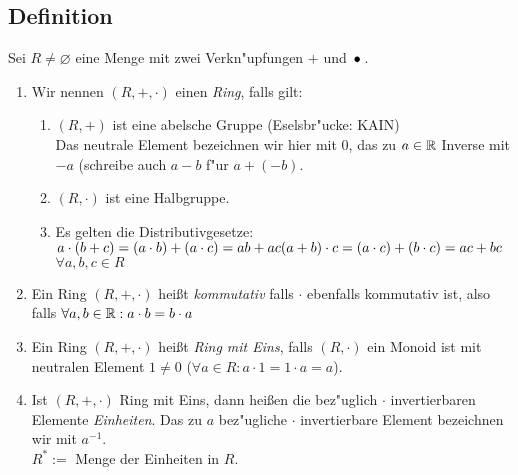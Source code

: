 \subsection[Definition: Ring]{Definition} \label{ring}
Sei $R \neq \varnothing$ eine Menge mit zwei Verkn"upfungen $+$ und $\,{\bullet}\,$.
{\renewcommand{\labelenumi}{(\roman{enumi})}
\begin{enumerate}
	\item
	Wir nennen $(R, +, \cdot)$ einen \emph{Ring}, falls gilt:
	{\renewcommand{\labelenumi}{\arabic{enumi})}\begin{enumerate}
		\item
		$(R,+)$ ist eine abelsche Gruppe (Eselsbr"ucke: KAIN)\\
		Das neutrale Element bezeichnen wir hier mit $0$, das zu $a \in \mathbb{R}$ Inverse mit $-a$ (schreibe auch $a-b$ f"ur $a+(-b)$.
		\item
		$(R,\cdot)$ ist eine Halbgruppe.
		\item
		Es gelten die Distributivgesetze:\\
		$a\cdot (b+c) = (a \cdot b) + (a \cdot c) = ab + ac\\
		(a+b) \cdot c = (a \cdot c) + (b \cdot c) = ac + bc$ \qquad $\forall a, b, c \in R$
	\end{enumerate}}
	\item
	Ein Ring $(R,+, \cdot)$ heißt \emph{kommutativ} falls $\cdot$ ebenfalls kommutativ ist, also falls ${\forall a,b \in \mathbb{R}: a \cdot b = b \cdot a}$
	\item
	Ein Ring $(R,+, \cdot)$ heißt \emph{Ring mit Eins}, falls $(R, \cdot)$ ein Monoid ist mit neutralen Element $1\neq 0$ \;($\forall a \in R: a \cdot 1 = 1 \cdot a = a$).
	\item
	Ist $(R, +, \cdot)$ Ring mit Eins, dann heißen die bez"uglich $\cdot$ invertierbaren Elemente \emph{Einheiten}. Das zu $a$ bez"ugliche $\cdot$
	invertierbare Element bezeichnen wir mit $a^{-1}$.\\ $R^* :=$ Menge der Einheiten in $R$.
\end{enumerate}}

